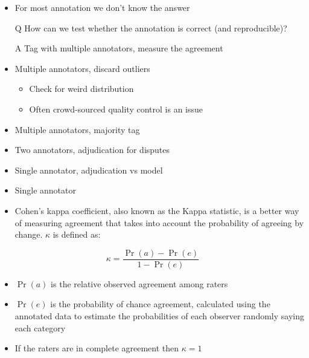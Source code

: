 \documentclass[a4paper,landscape,headrule,footrule,xetex]{foils}
\begin{document}
\begin{itemize}
\item For most annotation we don't know the answer
\item[Q] How can we test whether the annotation is correct (and reproducible)?
\item[A] Tag with multiple annotators, measure the agreement

\end{itemize}


\begin{itemize}
\item Multiple annotators, discard outliers
  \begin{itemize}
  \item Check for weird distribution
  \item Often crowd-sourced quality control is an issue
  \end{itemize}
\item Multiple annotators, majority tag
\item Two annotators, adjudication for disputes
\item Single annotator, adjudication vs model
\item Single annotator
\end{itemize}


\begin{itemize}
\item Cohen's kappa coefficient, also known as the Kappa statistic, is a better way of measuring agreement that takes into account the probability of agreeing by change.  $\kappa$ is defined as:
\end{itemize}
\begin{equation}
  \label{eq:1}
  \kappa = \frac{\Pr(a) - \Pr(e)}{1 - \Pr(e)}
\end{equation}

\begin{itemize}
\item $\Pr(a)$ is the relative observed agreement among raters
\item $\Pr(e)$ is the probability of chance agreement, calculated using
the annotated data to estimate the probabilities of each observer
randomly saying each category
\item If the raters are in complete agreement then $\kappa = 1$
\end{itemize}
\end{document}

